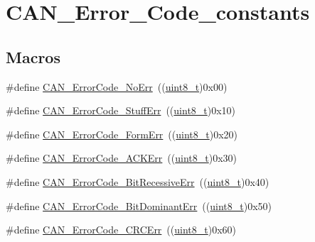 \hypertarget{group___c_a_n___error___code__constants}{}\section{C\+A\+N\+\_\+\+Error\+\_\+\+Code\+\_\+constants}
\label{group___c_a_n___error___code__constants}
\subsection*{Macros}
\begin{DoxyCompactItemize}
\item 
\#define \hyperlink{group___c_a_n___error___code__constants_ga025d891e9c5cec2cfecb2213b4f74a9e}{C\+A\+N\+\_\+\+Error\+Code\+\_\+\+No\+Err}~((\hyperlink{_p_e___types_8h_aba7bc1797add20fe3efdf37ced1182c5}{uint8\+\_\+t})0x00)
\item 
\#define \hyperlink{group___c_a_n___error___code__constants_gaa733d1c078472912c3bf60fbdc53734d}{C\+A\+N\+\_\+\+Error\+Code\+\_\+\+Stuff\+Err}~((\hyperlink{_p_e___types_8h_aba7bc1797add20fe3efdf37ced1182c5}{uint8\+\_\+t})0x10)
\item 
\#define \hyperlink{group___c_a_n___error___code__constants_ga1fe585558bb8d5c834b4266661392cb2}{C\+A\+N\+\_\+\+Error\+Code\+\_\+\+Form\+Err}~((\hyperlink{_p_e___types_8h_aba7bc1797add20fe3efdf37ced1182c5}{uint8\+\_\+t})0x20)
\item 
\#define \hyperlink{group___c_a_n___error___code__constants_gad47e6af0116d1b6de85e29286c0b8607}{C\+A\+N\+\_\+\+Error\+Code\+\_\+\+A\+C\+K\+Err}~((\hyperlink{_p_e___types_8h_aba7bc1797add20fe3efdf37ced1182c5}{uint8\+\_\+t})0x30)
\item 
\#define \hyperlink{group___c_a_n___error___code__constants_gaf800de7683f1d22194e1df8eb3b1c5bb}{C\+A\+N\+\_\+\+Error\+Code\+\_\+\+Bit\+Recessive\+Err}~((\hyperlink{_p_e___types_8h_aba7bc1797add20fe3efdf37ced1182c5}{uint8\+\_\+t})0x40)
\item 
\#define \hyperlink{group___c_a_n___error___code__constants_gaa19708aa85d1a34f8f7f25a2bfe88b19}{C\+A\+N\+\_\+\+Error\+Code\+\_\+\+Bit\+Dominant\+Err}~((\hyperlink{_p_e___types_8h_aba7bc1797add20fe3efdf37ced1182c5}{uint8\+\_\+t})0x50)
\item 
\#define \hyperlink{group___c_a_n___error___code__constants_gafa75157442dba7ba1a91036242b78e92}{C\+A\+N\+\_\+\+Error\+Code\+\_\+\+C\+R\+C\+Err}~((\hyperlink{_p_e___types_8h_aba7bc1797add20fe3efdf37ced1182c5}{uint8\+\_\+t})0x60)

\end{DoxyCompactItemize}
